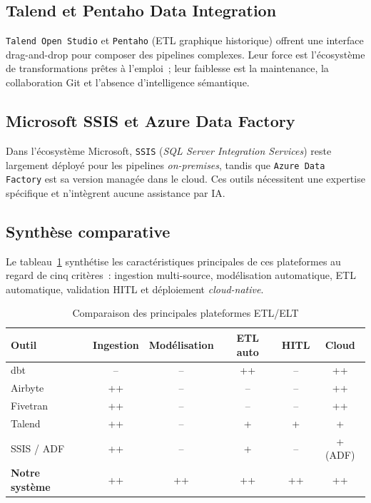 \documentclass[12pt, a4paper]{report}
\begin{document}
\subsection{Talend et Pentaho Data Integration}
\texttt{Talend Open Studio} et \texttt{Pentaho} (\ac{ETL} graphique
historique) offrent une interface drag-and-drop pour composer des
pipelines complexes. Leur force est l'écosystème de transformations
prêtes à l'emploi~; leur faiblesse est la maintenance, la
collaboration Git et l'absence d'intelligence sémantique.

\subsection{Microsoft SSIS et Azure Data Factory}
Dans l'écosystème Microsoft, \texttt{SSIS} (\emph{SQL Server
Integration Services}) reste largement déployé pour les pipelines
\emph{on-premises}, tandis que \texttt{Azure Data Factory} est sa
version managée dans le cloud. Ces outils nécessitent une expertise
spécifique et n'intègrent aucune assistance par IA.

\subsection{Synthèse comparative}
Le tableau~\ref{tab:etl-tools} synthétise les caractéristiques
principales de ces plateformes au regard de cinq critères~: ingestion
multi-source, modélisation automatique, ETL automatique, validation
\ac{HITL} et déploiement \emph{cloud-native}.

\begin{table}[H]
\centering
\caption{Comparaison des principales plateformes ETL/ELT}
\label{tab:etl-tools}
\small
\begin{tabular}{lccccc}
\toprule
\textbf{Outil} & \textbf{Ingestion} & \textbf{Modélisation} & \textbf{ETL auto} & \textbf{HITL} & \textbf{Cloud} \\
\midrule
dbt           & --   & --   & ++   & --   & ++ \\
Airbyte       & ++   & --   & --   & --   & ++ \\
Fivetran      & ++   & --   & --   & --   & ++ \\
Talend        & ++   & --   & +    & +    & +  \\
SSIS / ADF    & ++   & --   & +    & --   & + (ADF) \\
\textbf{Notre système} & ++   & ++   & ++   & ++   & ++ \\
\bottomrule
\end{tabular}
\end{table}
\end{document}
